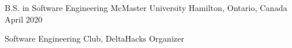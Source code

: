 


\begin{cventries}


\cventry
{B.S. in Software Engineering} %
{McMaster University} %
{Hamilton, Ontario, Canada} %
{April 2020} %
{ %
\begin{cvitems}
\item {Software Engineering Club, DeltaHacks Organizer}
\end{cvitems}
}


\end{cventries}